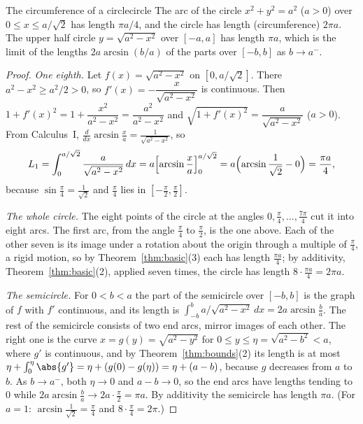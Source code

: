 \documentclass[11pt]{article}
\begin{document}
\begin{thm}{The circumference of a circle}{circle}
The arc of the circle $x^2+y^2=a^2$ ($a>0$) over $0\le x\le a/\sqrt2$ has length $\pi a/4$, and the circle has length (circumference) $2\pi a$. The upper half circle $y=\sqrt{a^2-x^2}$ over $[-a,a]$ has length $\pi a$, which is the limit of the lengths $2a\arcsin(b/a)$ of the parts over $[-b,b]$ as $b\to a^-$.
\end{thm}
\begin{proof}
\emph{One eighth.} Let $f(x)=\sqrt{a^2-x^2}$ on $[0,a/\sqrt2]$. There $a^2-x^2\ge a^2/2>0$, so $f'(x)=-\dfrac x{\sqrt{a^2-x^2}}$ is continuous. Then $1+f'(x)^2=1+\dfrac{x^2}{a^2-x^2}=\dfrac{a^2}{a^2-x^2}$ and $\sqrt{1+f'(x)^2}=\dfrac a{\sqrt{a^2-x^2}}$ ($a>0$). From Calculus~I, $\frac d{dx}\arcsin\frac xa=\frac1{\sqrt{a^2-x^2}}$, so
\[
L_1=\int_0^{a/\sqrt2}\frac a{\sqrt{a^2-x^2}}\,dx=a\Bigl[\arcsin\frac xa\Bigr]_0^{a/\sqrt2}=a\Bigl(\arcsin\frac1{\sqrt2}-0\Bigr)=\frac{\pi a}4,
\]
because $\sin\frac\pi4=\frac1{\sqrt2}$ and $\frac\pi4$ lies in $[-\frac\pi2,\frac\pi2]$.

\emph{The whole circle.} The eight points of the circle at the angles $0,\frac\pi4,\dots,\frac{7\pi}4$ cut it into eight arcs. The first arc, from the angle $\frac\pi4$ to $\frac\pi2$, is the one above. Each of the other seven is its image under a rotation about the origin through a multiple of $\frac\pi4$, a rigid motion, so by Theorem~\ref{thm:basic}(3) each has length $\frac{\pi a}4$; by additivity, Theorem~\ref{thm:basic}(2), applied seven times, the circle has length $8\cdot\frac{\pi a}4=2\pi a$.

\emph{The semicircle.} For $0<b<a$ the part of the semicircle over $[-b,b]$ is the graph of $f$ with $f'$ continuous, and its length is $\int_{-b}^ba/\sqrt{a^2-x^2}\,dx=2a\arcsin\frac ba$. The rest of the semicircle consists of two end arcs, mirror images of each other. The right one is the curve $x=g(y)=\sqrt{a^2-y^2}$ for $0\le y\le\eta=\sqrt{a^2-b^2}<a$, where $g'$ is continuous, and by Theorem~\ref{thm:bounds}(2) its length is at most $\eta+\int_0^\eta\abs{g'}=\eta+(g(0)-g(\eta))=\eta+(a-b)$, because $g$ decreases from $a$ to $b$. As $b\to a^-$, both $\eta\to0$ and $a-b\to0$, so the end arcs have lengths tending to $0$ while $2a\arcsin\frac ba\to2a\cdot\frac\pi2=\pi a$. By additivity the semicircle has length $\pi a$.
(For $a=1$: $\arcsin\frac1{\sqrt2}=\frac\pi4$ and $8\cdot\frac\pi4=2\pi$.)
\end{proof}
\end{document}
